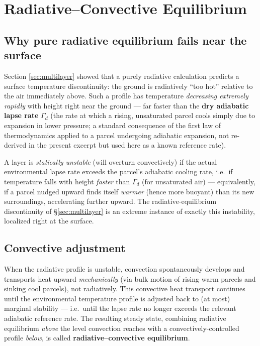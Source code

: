 \documentclass[11pt]{article}
\begin{document}
\section{Radiative--Convective Equilibrium}
\label{sec:radconv}

\subsection{Why pure radiative equilibrium fails near the surface}
Section \ref{sec:multilayer} showed that a purely radiative calculation predicts a surface temperature discontinuity: the ground is radiatively ``too hot'' relative to the air immediately above. Such a profile has temperature \emph{decreasing extremely rapidly} with height right near the ground — far faster than the \textbf{dry adiabatic lapse rate} $\Gamma_d$ (the rate at which a rising, unsaturated parcel cools simply due to expansion in lower pressure; a standard consequence of the first law of thermodynamics applied to a parcel undergoing adiabatic expansion, not re-derived in the present excerpt but used here as a known reference rate).

\begin{defbox}
A layer is \emph{statically unstable} (will overturn convectively) if the actual environmental lapse rate exceeds the parcel's adiabatic cooling rate, i.e.\ if temperature falls with height \emph{faster} than $\Gamma_d$ (for unsaturated air) — equivalently, if a parcel nudged upward finds itself \emph{warmer} (hence more buoyant) than its new surroundings, accelerating further upward. The radiative-equilibrium discontinuity of \S\ref{sec:multilayer} is an extreme instance of exactly this instability, localized right at the surface.
\end{defbox}

\subsection{Convective adjustment}
When the radiative profile is unstable, convection spontaneously develops and transports heat upward \emph{mechanically} (via bulk motion of rising warm parcels and sinking cool parcels), not radiatively. This convective heat transport continues until the environmental temperature profile is adjusted back to (at most) marginal stability — i.e.\ until the lapse rate no longer exceeds the relevant adiabatic reference rate. The resulting steady state, combining radiative equilibrium \emph{above} the level convection reaches with a convectively-controlled profile \emph{below}, is called \textbf{radiative--convective equilibrium}.
\end{document}
